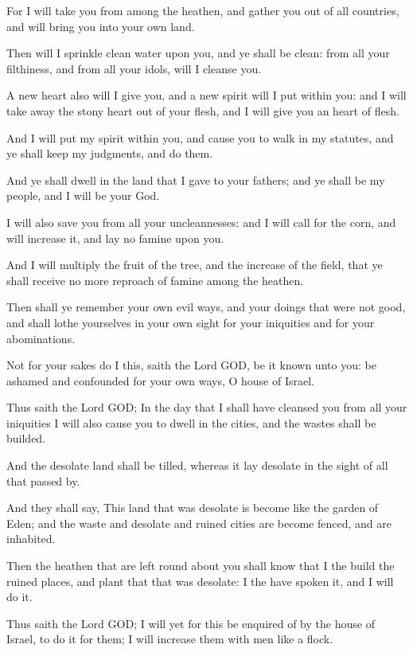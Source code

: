 \Verse For I will take you from among the heathen, and gather you out of all countries, and will bring you into your own land.

\Verse Then will I sprinkle clean water upon you, and ye shall be clean: from all your filthiness, and from all your idols, will I cleanse you.

\Verse A new heart also will I give you, and a new spirit will I put within you: and I will take away the stony heart out of your flesh, and I will give you an heart of flesh.

\Verse And I will put my spirit within you, and cause you to walk in my statutes, and ye shall keep my judgments, and do them.

\Verse And ye shall dwell in the land that I gave to your fathers; and ye shall be my people, and I will be your God.

\Verse I will also save you from all your uncleannesses: and I will call for the corn, and will increase it, and lay no famine upon you.

\Verse And I will multiply the fruit of the tree, and the increase of the field, that ye shall receive no more reproach of famine among the heathen.

\Verse Then shall ye remember your own evil ways, and your doings that were not good, and shall lothe yourselves in your own sight for your iniquities and for your abominations.

\Verse Not for your sakes do I this, saith the Lord GOD, be it known unto you: be ashamed and confounded for your own ways, O house of Israel.

\Verse Thus saith the Lord GOD; In the day that I shall have cleansed you from all your iniquities I will also cause you to dwell in the cities, and the wastes shall be builded.

\Verse And the desolate land shall be tilled, whereas it lay desolate in the sight of all that passed by.

\Verse And they shall say, This land that was desolate is become like the garden of Eden; and the waste and desolate and ruined cities are become fenced, and are inhabited.

\Verse Then the heathen that are left round about you shall know that I the \LORD build the ruined places, and plant that that was desolate: I the \LORD have spoken it, and I will do it.

\Verse Thus saith the Lord GOD; I will yet for this be enquired of by the house of Israel, to do it for them; I will increase them with men like a flock.

